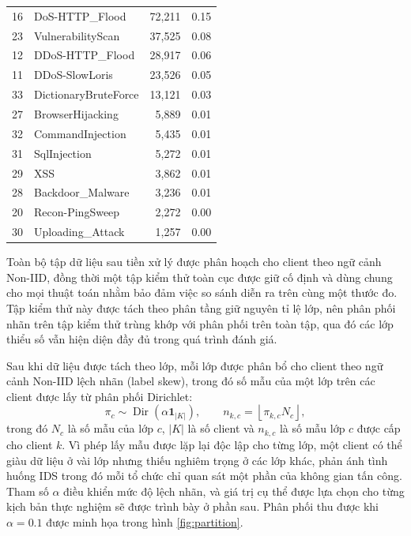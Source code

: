 \begin{table}[H]
\begin{tabular}{rlrr}
        16 & DoS-HTTP\_Flood           & 72{,}211      & 0.15 \\
        23 & VulnerabilityScan         & 37{,}525      & 0.08 \\
        12 & DDoS-HTTP\_Flood          & 28{,}917      & 0.06 \\
        11 & DDoS-SlowLoris            & 23{,}526      & 0.05 \\
        33 & DictionaryBruteForce      & 13{,}121      & 0.03 \\
        27 & BrowserHijacking          & 5{,}889       & 0.01 \\
        32 & CommandInjection          & 5{,}435       & 0.01 \\
        31 & SqlInjection              & 5{,}272       & 0.01 \\
        29 & XSS                       & 3{,}862       & 0.01 \\
        28 & Backdoor\_Malware         & 3{,}236       & 0.01 \\
        20 & Recon-PingSweep           & 2{,}272       & 0.00 \\
        30 & Uploading\_Attack         & 1{,}257       & 0.00 \\
        \hline
    \end{tabular}
\end{table}

Toàn bộ tập dữ liệu sau tiền xử lý được phân hoạch cho client theo ngữ cảnh Non-IID, đồng thời một tập kiểm thử toàn cục được giữ cố định và dùng chung cho mọi thuật toán nhằm bảo đảm việc so sánh diễn ra trên cùng một thước đo. Tập kiểm thử này được tách theo phân tầng giữ nguyên tỉ lệ lớp, nên phân phối nhãn trên tập kiểm thử trùng khớp với phân phối trên toàn tập, qua đó các lớp thiểu số vẫn hiện diện đầy đủ trong quá trình đánh giá.

Sau khi dữ liệu được tách theo lớp, mỗi lớp được phân bổ cho client theo ngữ cảnh Non-IID lệch nhãn (label skew), trong đó số mẫu của một lớp trên các client được lấy từ phân phối Dirichlet:
\[
\pi_c\sim \operatorname{Dir}(\alpha\mathbf{1}_{|K|}),
\qquad
n_{k,c}=\left\lfloor \pi_{k,c}N_c\right\rfloor,
\]
trong đó $N_c$ là số mẫu của lớp $c$, $|K|$ là số client và $n_{k,c}$ là số mẫu lớp $c$ được cấp cho client $k$. Vì phép lấy mẫu được lặp lại độc lập cho từng lớp, một client có thể giàu dữ liệu ở vài lớp nhưng thiếu nghiêm trọng ở các lớp khác, phản ánh tình huống IDS trong đó mỗi tổ chức chỉ quan sát một phần của không gian tấn công. Tham số $\alpha$ điều khiển mức độ lệch nhãn, và giá trị cụ thể được lựa chọn cho từng kịch bản thực nghiệm sẽ được trình bày ở phần sau. Phân phối thu được khi $\alpha=0.1$ được minh họa trong hình \ref{fig:partition}.

